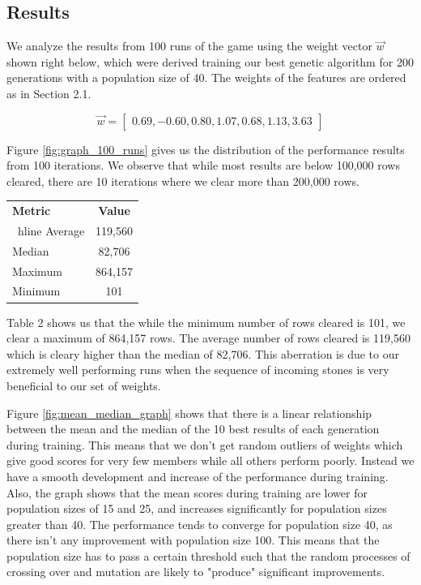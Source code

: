 \subsection{Results}
We analyze the results from 100 runs of the game using the weight vector $\vec{w}$ shown right below, which were derived training our best genetic algorithm for 200 generations with a population size of 40. The weights of the features are ordered as in Section 2.1. 

$$\vec{w} = 
\begin{bmatrix}
0.69, -0.60, 0.80, 1.07, 0.68, 1.13, 3.63
\end{bmatrix}$$

Figure \ref{fig:graph_100_runs} gives us the distribution of the performance results from 100 iterations. We observe that while most results are below 100,000 rows cleared, there are 10 iterations where we clear more than 200,000 rows.  

\centering
\begin{tabular}{| l | c |}
\hline
\textbf{Metric} & \textbf{Value} \\
\       hline
Average & 119,560 	\\ \hline
Median & 82,706 		\\ \hline
Maximum & 864,157 		\\ \hline
Minimum & 101		 	\\ \hline
\end{tabular}
\justify

Table 2 shows us that the while the minimum number of rows cleared is 101, we clear a maximum of 864,157 rows. The average number of rows cleared is 119,560 which is cleary higher than the median of 82,706. This aberration is due to our extremely well performing runs when the sequence of incoming stones is very beneficial to our set of weights.

Figure \ref{fig:mean_median_graph} shows that there is a linear relationship between the mean and the median of the 10 best results of each generation during training. This means that we don't get random outliers of weights which give good scores for very few members while all others perform poorly. Instead we have a smooth development and increase of the performance during training. Also, the graph shows that the mean scores during training are lower for population sizes of 15 and 25, and increases significantly for population sizes greater than 40. The performance tends to converge for population size 40, as there isn't any improvement with population size 100. This means that the population size has to pass a certain threshold such that the random processes of crossing over and mutation are likely to "produce" significant improvements.

